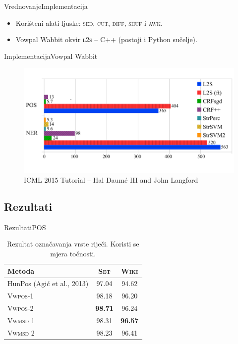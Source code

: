 \documentclass{beamer}
\def \lts {\textsc{l2s}}
\begin{document}
\begin{frame}{Vrednovanje}{Implementacija}
  \begin{itemize}
  \item Korišteni alati ljuske: \textsc{sed}, \textsc{cut}, \textsc{diff}, \textsc{shuf} i \textsc{awk}.
  \item Vowpal Wabbit okvir \lts{} -- C++ (postoji i Python sučelje).
  \end{itemize}
\end{frame}

\begin{frame}{Implementacija}{Vowpal Wabbit}
  \begin{figure}
    \centering
    \includegraphics[scale=0.6]{../tokenposec.pdf}
    \caption{ICML 2015 Tutorial -- Hal Daum\'e III and John Langford }
  \end{figure}
\end{frame}

\subsection{Rezultati}

\begin{frame}{Rezultati}{POS}
  \begin{table}
  \centering
  \caption[Rezultat označavanja vrste riječi.]{Rezultat označavanja vrste riječi.
  Koristi se mjera točnosti.}
  \label{table:postagging}
  \begin{tabular}{|l|c|c|}
  \hline
  Metoda                               & \textsc{Set}   & \textsc{Wiki}  \\ \hline \hline
  HunPos (Agić et al., 2013)           & 97.04          & 94.62          \\
  \textsc{Vwpos-1}                     & 98.18          & 96.20          \\
  \textsc{Vwpos-2}                     & \textbf{98.71} & 96.24          \\
  \textsc{Vwmsd} 1                     & 98.31          & \textbf{96.57} \\
  \textsc{Vwmsd} 2                     & 98.23          & 96.41          \\ \hline
  \end{tabular}
  \end{table}
\end{frame}
\end{document}
